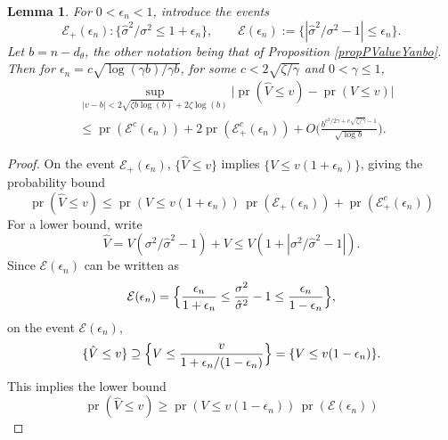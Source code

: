 \documentclass[10pt, reqno]{amsart}
\newtheorem{lemma}{Lemma}[section]
\numberwithin{equation}{section}
\newcommand{\pr}{\mathop{\mathrm{pr}}}
\begin{document}
\begin{appendix}
\begin{lemma}\label{lemmaPart1}
	For $0<\epsilon_n <1$, introduce the events 
	\[
	\mathcal{E}_+(\epsilon_n) : \{\hat\sigma^2/\sigma^2 \leq 1+\epsilon_n\}, \quad \quad
	\mathcal{E}(\epsilon_n) := \{|\hat\sigma^2/\sigma^2 - 1| \leq \epsilon_n\}.
	\]
	Let $b = n -d_\theta$, the other notation being that of Proposition \ref{propPValueYanbo}. Then for $\epsilon_n   =  c\sqrt{\log(\gamma b)/\gamma b }$, for some $c < 2\sqrt{\zeta/\gamma}$ and $0 <\gamma \leq 1$,
	\begin{align*}
		&\sup_{|v - b| <   2\sqrt{\zeta b\log(b)} + 2\zeta\log(b)  } \bigl|\pr(\hat V \leq v) - \pr(V \leq v)\bigr| \\
		&\leq \pr(\mathcal{E}^c(\epsilon_n)) + 2\pr(\mathcal{E}_{+}^c(\epsilon_n)) + O\biggl( \frac{b^{c^2/2\gamma + c\sqrt{\zeta/\gamma} - 1}}{\sqrt{\log b}}\biggr).
	\end{align*}
\end{lemma}
\begin{proof}
	On the event $\mathcal{E}_+(\epsilon_n)$, $\{\hat V \leq v\}$ implies $\{V\leq v(1+\epsilon_n)\}$, giving the probability bound
	\begin{equation}\label{eqUpperPr}
		\pr(\hat V \leq v) \leq \pr(V\leq v(1+\epsilon_n))\,\pr(\mathcal{E}_{+}(\epsilon_n)) + \pr(\mathcal{E}_{+}^c(\epsilon_n))
	\end{equation}
	For a lower bound, write
	\[
	\hat V = V(\sigma^2/\hat{\sigma}^2 - 1) + V \leq V(1+ |\sigma^2/\hat{\sigma}^2 - 1|).
	\]
	Since $\mathcal{E}(\epsilon_n)$ can be written as
	\[
	\mathcal{E}(\epsilon_n) = \Bigl\{\frac{\epsilon_n}{1+\epsilon_n} \leq \frac{\sigma^2}{\hat\sigma^2} - 1 \leq \frac{\epsilon_n}{1-\epsilon_n} \Bigr\},
	\]
	on the event $\mathcal{E}(\epsilon_n)$,
	\[
	\{\hat V \leq v\} \supseteq \Bigl\{V \leq \frac{v}{1+\epsilon_n/(1-\epsilon_n)} \Bigr\} = \{V\leq v(1-\epsilon_n)\}.
	\]
	This implies the lower bound
	\begin{equation}\label{eqLowerPr}
		\pr(\hat V \leq v) \geq \pr(V\leq v(1-\epsilon_n))\,\pr(\mathcal{E}(\epsilon_n))
	\end{equation}
	

\end{proof}
\end{appendix}
\end{document}
